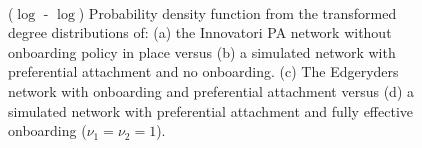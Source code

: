 \documentclass{article}
\begin{document}
\begin{figure}
\\
\caption{($\log$ - $\log$) Probability density function from the transformed degree distributions of: (a) the Innovatori PA network without onboarding policy in place versus (b) a simulated network with preferential attachment and no onboarding.
(c) The Edgeryders network with onboarding and preferential attachment versus (d) a simulated network with preferential attachment and fully effective onboarding ($\nu_1 = \nu_2 = 1$).\vspace{-.5cm}}
 \label{fig:PDFViz}
\end{figure}
\end{document}

